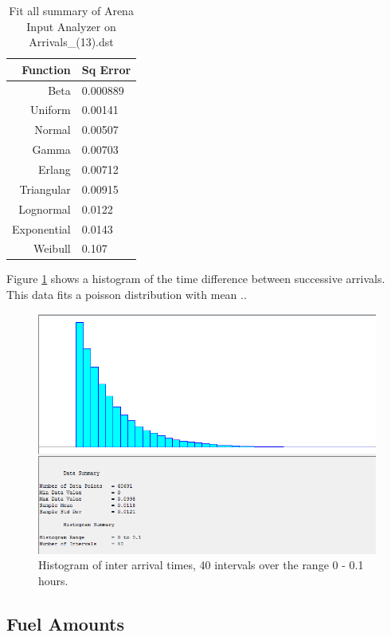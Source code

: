 \begin{table}[h]
	\centering
	\begin{tabular}{r | l}
		Function  &     Sq Error\\
		\hline
		Beta       &  0.000889\\
		Uniform     & 0.00141\\
		Normal       &0.00507\\
		Gamma        &0.00703\\
		Erlang       &0.00712\\
		Triangular   &0.00915\\
		Lognormal    &0.0122\\
		Exponential  &0.0143\\
		Weibull      &0.107	
	\end{tabular}
	\caption{Fit all summary of Arena Input Analyzer on Arrivals\_(13).dst}
	\label{tab:fitallarrivals}
\end{table}

Figure \ref{fig:histogram-inter-arrivals} shows a histogram of the time difference between successive arrivals. This data fits a poisson distribution with mean .. 

\begin{figure}[h]
	\includegraphics[width=\textwidth]{images/histogram-interarrivaltimes.PNG}
	\caption{Histogram of inter arrival times, 40 intervals over the range 0 - 0.1 hours.}
	\label{fig:histogram-inter-arrivals}
\end{figure}

\subsection{Fuel Amounts}

